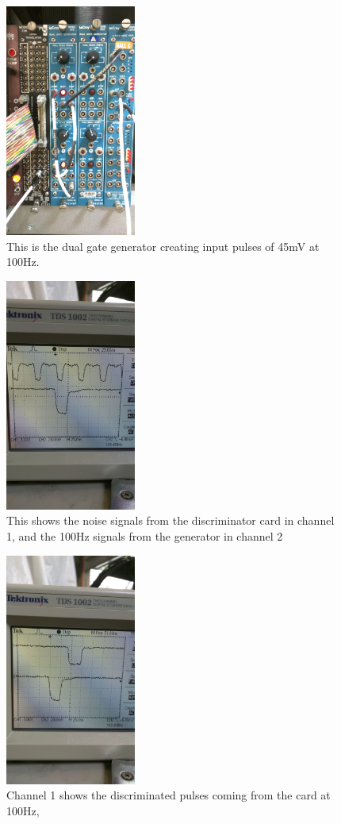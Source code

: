 \documentclass[final]{report}
\begin{document}
\begin{figure}[13]
  \centering
  \includegraphics[height=3in]{IMG_20150715_153904.jpg}
  \caption{This is the dual gate generator creating input pulses of 45mV at 100Hz.}
  \label{fig:generator}
\end{figure}

\begin{figure}[14]
  \centering
  \includegraphics[height=3in]{IMG_20150715_154938.jpg}
  \caption{This shows the noise signals from the discriminator card in channel 1, and the 100Hz signals from the generator in channel 2}
  \label{fig:noise2}
\end{figure}\begin{figure}[15]
  \centering
  \includegraphics[height=3in]{IMG_20150715_155119.jpg}
  \caption{Channel 1 shows the discriminated pulses coming from the card at 100Hz, }
  \label{fig:discriminated}
\end{figure}
\end{document}
